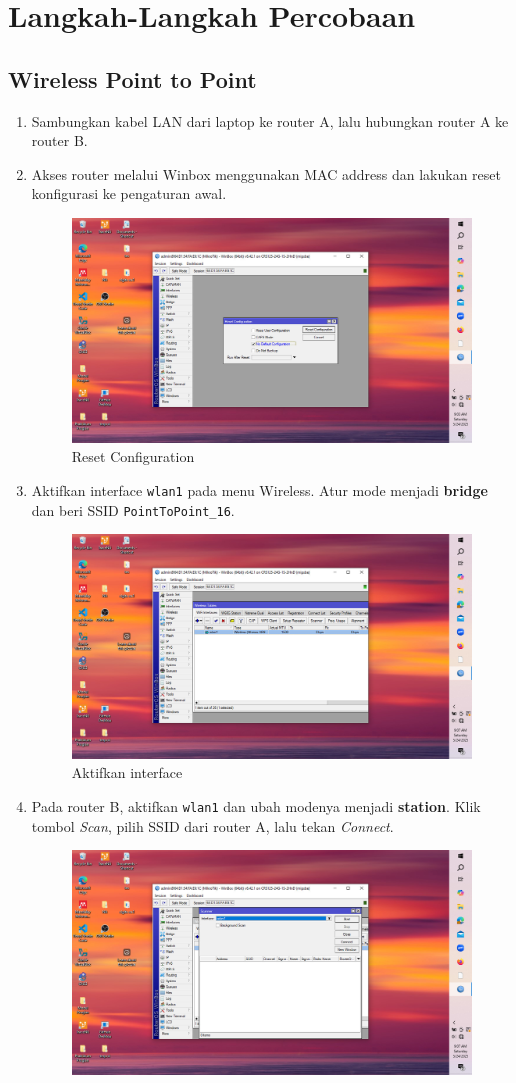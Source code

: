 
\section{Langkah-Langkah Percobaan}

\subsection{Wireless Point to Point}
\begin{enumerate}
    \item Sambungkan kabel LAN dari laptop ke router A, lalu hubungkan router A ke router B.
    \item Akses router melalui Winbox menggunakan MAC address dan lakukan reset konfigurasi ke pengaturan awal.
      \begin{figure}[H]
        \centering
        \includegraphics[width=0.5\linewidth]{P1/img/1.jpeg}
        \caption{Reset Configuration}
        \label{fig:gambar4}
    \end{figure}
    \item Aktifkan interface \texttt{wlan1} pada menu Wireless. Atur mode menjadi \textbf{bridge} dan beri SSID \texttt{PointToPoint\_16}.
     \begin{figure}[H]
        \centering
        \includegraphics[width=0.5\linewidth]{P1/img/3.jpeg}
        \caption{Aktifkan interface}
        \label{fig:gambar4}
    \end{figure}
    \item Pada router B, aktifkan \texttt{wlan1} dan ubah modenya menjadi \textbf{station}. Klik tombol
    \textit{Scan}, pilih SSID dari router A, lalu tekan \textit{Connect}.
     \begin{figure}[H]
        \centering
        \includegraphics[width=0.5\linewidth]{P1/img/4.jpeg}

\end{figure}
\end{enumerate}
